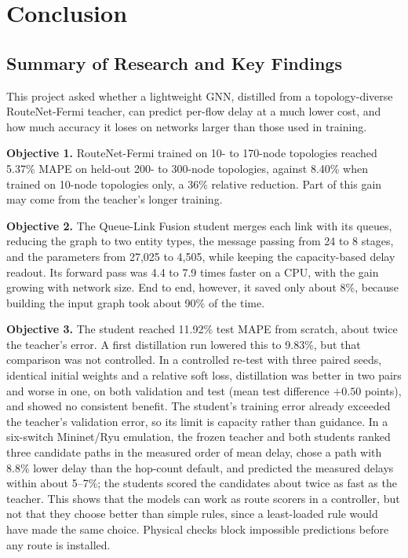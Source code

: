 \chapter{Conclusion}
\label{ch:conclusion}

\section{Summary of Research and Key Findings}

This project asked whether a lightweight GNN, distilled from a topology-diverse RouteNet-Fermi teacher, can predict per-flow delay at a much lower cost, and how much accuracy it loses on networks larger than those used in training.

\textbf{Objective 1.} RouteNet-Fermi trained on 10- to 170-node topologies reached 5.37\% MAPE on held-out 200- to 300-node topologies, against 8.40\% when trained on 10-node topologies only, a 36\% relative reduction. Part of this gain may come from the teacher's longer training.

\textbf{Objective 2.} The Queue-Link Fusion student merges each link with its queues, reducing the graph to two entity types, the message passing from 24 to 8 stages, and the parameters from 27,025 to 4,505, while keeping the capacity-based delay readout. Its forward pass was 4.4 to 7.9 times faster on a CPU, with the gain growing with network size. End to end, however, it saved only about 8\%, because building the input graph took about 90\% of the time.

\textbf{Objective 3.} The student reached 11.92\% test MAPE from scratch, about twice the teacher's error. A first distillation run lowered this to 9.83\%, but that comparison was not controlled. In a controlled re-test with three paired seeds, identical initial weights and a relative soft loss, distillation was better in two pairs and worse in one, on both validation and test (mean test difference $+0.50$ points), and showed no consistent benefit. The student's training error already exceeded the teacher's validation error, so its limit is capacity rather than guidance. In a six-switch Mininet/Ryu emulation, the frozen teacher and both students ranked three candidate paths in the measured order of mean delay, chose a path with 8.8\% lower delay than the hop-count default, and predicted the measured delays within about 5--7\%; the students scored the candidates about twice as fast as the teacher. This shows that the models can work as route scorers in a controller, but not that they choose better than simple rules, since a least-loaded rule would have made the same choice. Physical checks block impossible predictions before any route is installed.

